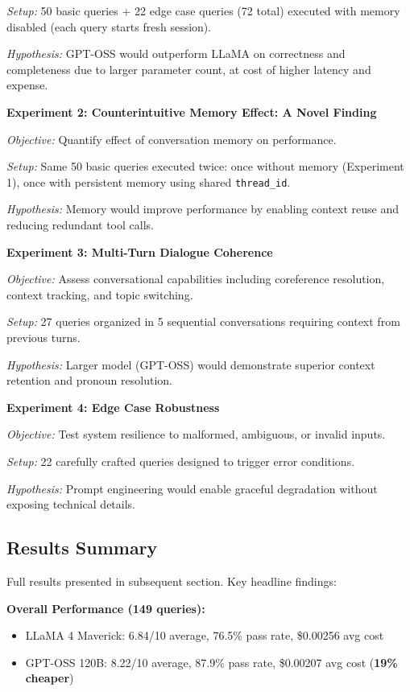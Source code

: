 \documentclass{article}
\begin{document}
\textit{Setup:} 50 basic queries + 22 edge case queries (72 total) executed with memory disabled (each query starts fresh session).

\textit{Hypothesis:} GPT-OSS would outperform LLaMA on correctness and completeness due to larger parameter count, at cost of higher latency and expense.

\textbf{Experiment 2: Counterintuitive Memory Effect: A Novel Finding}

\textit{Objective:} Quantify effect of conversation memory on performance.

\textit{Setup:} Same 50 basic queries executed twice: once without memory (Experiment 1), once with persistent memory using shared \texttt{thread\_id}.

\textit{Hypothesis:} Memory would improve performance by enabling context reuse and reducing redundant tool calls.

\textbf{Experiment 3: Multi-Turn Dialogue Coherence}

\textit{Objective:} Assess conversational capabilities including coreference resolution, context tracking, and topic switching.

\textit{Setup:} 27 queries organized in 5 sequential conversations requiring context from previous turns.

\textit{Hypothesis:} Larger model (GPT-OSS) would demonstrate superior context retention and pronoun resolution.

\textbf{Experiment 4: Edge Case Robustness}

\textit{Objective:} Test system resilience to malformed, ambiguous, or invalid inputs.

\textit{Setup:} 22 carefully crafted queries designed to trigger error conditions.

\textit{Hypothesis:} Prompt engineering would enable graceful degradation without exposing technical details.

\subsection{Results Summary}

Full results presented in subsequent section. Key headline findings:

\textbf{Overall Performance (149 queries):}
\begin{itemize}
    \item LLaMA 4 Maverick: 6.84/10 average, 76.5\% pass rate, \$0.00256 avg cost
    \item GPT-OSS 120B: 8.22/10 average, 87.9\% pass rate, \$0.00207 avg cost (\textbf{19\% cheaper})
\end{itemize}
\end{document}
